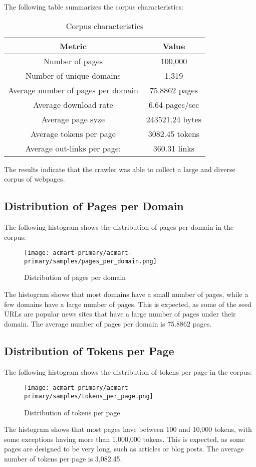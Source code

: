 \documentclass[sigconf]{acmart}
\begin{document}
The following table summarizes the corpus characteristics:
\begin{table}[H]
\centering
\begin{tabular}{|c|c|}
\hline
\textbf{Metric} & \textbf{Value} \\ \hline
Number of pages & 100,000 \\ \hline
Number of unique domains & 1,319 \\ \hline
Average number of pages per domain & 75.8862 pages\\ \hline
Average download rate & 6.64 pages/sec\\ \hline
Average page syze & 243521.24 bytes \\ \hline
Average tokens per page & 3082.45 tokens \\ \hline
Average out-links per page: &  360.31 links \\ \hline
\end{tabular}
\caption{Corpus characteristics}
\label{tab:corpus}
\end{table}
The results indicate that the crawler was able to collect a large and diverse corpus of webpages.

\subsection{Distribution of Pages per Domain}
The following histogram shows the distribution of pages per domain in the corpus:
\begin{figure}[h]
\centering
\texttt{[image: acmart-primary/acmart-primary/samples/pages\_per\_domain.png]}
\caption{Distribution of pages per domain}
\label{fig:histogram}
\end{figure}
The histogram shows that most domains have a small number of pages, while a few domains have a large number of pages. This is expected, as some of the seed URLs are popular news sites that have a large number of pages under their domain. The average number of pages per domain is 75.8862 pages.

\subsection{Distribution of Tokens per Page}
The following histogram shows the distribution of tokens per page in the corpus:
\begin{figure}[H]
\centering
\texttt{[image: acmart-primary/acmart-primary/samples/tokens\_per\_page.png]}
\caption{Distribution of tokens per page}
\label{fig:histogram_tokens}
\end{figure}
The histogram shows that most pages have between 100 and 10,000 tokens, with some exceptions having more than 1,000,000 tokens. This is expected, as some pages are designed to be very long, such as articles or blog posts. The average number of tokens per page is 3,082.45.
\end{document}
